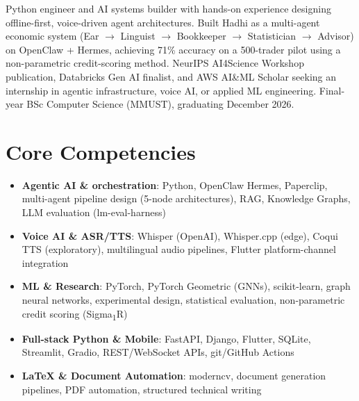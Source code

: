 \documentclass[11pt,a4paper,sans]{moderncv}
\begin{document}
\makecvtitle


\vspace{6pt}
\small{
Python engineer and AI systems builder with hands-on experience designing offline-first, voice-driven agent architectures. Built Hadhi as a multi-agent economic system (Ear $\to$ Linguist $\to$ Bookkeeper $\to$ Statistician $\to$ Advisor) on OpenClaw + Hermes, achieving 71\% accuracy on a 500-trader pilot using a non-parametric credit-scoring method. NeurIPS AI4Science Workshop publication, Databricks Gen AI finalist, and AWS AI\&ML Scholar seeking an internship in agentic infrastructure, voice AI, or applied ML engineering. Final-year BSc Computer Science (MMUST), graduating December 2026.
}


\section{Core Competencies}
\vspace{1pt}
\begin{itemize}

\item \textbf{Agentic AI \& orchestration}: Python, OpenClaw Hermes, Paperclip, multi-agent pipeline design (5-node architectures), RAG, Knowledge Graphs, LLM evaluation (lm-eval-harness)

\item \textbf{Voice AI \& ASR/TTS}: Whisper (OpenAI), Whisper.cpp (edge), Coqui TTS (exploratory), multilingual audio pipelines, Flutter platform-channel integration

\item \textbf{ML \& Research}: PyTorch, PyTorch Geometric (GNNs), scikit-learn, graph neural networks, experimental design, statistical evaluation, non-parametric credit scoring (Sigma\textsubscript{1}R)

\item \textbf{Full-stack Python \& Mobile}: FastAPI, Django, Flutter, SQLite, Streamlit, Gradio, REST/WebSocket APIs, git/GitHub Actions

\item \textbf{LaTeX \& Document Automation}: moderncv, document generation pipelines, PDF automation, structured technical writing

\end{itemize}
\end{document}
